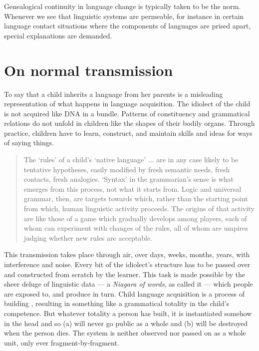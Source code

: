 Genealogical continuity in language change is typically taken to be the 
norm. Whenever we see that linguistic systems are permeable, for instance in certain language contact situations where the 
components of languages are prised apart, special explanations are 
demanded. 

\section{On normal transmission}

To say that a child inherits a language from her parents is a misleading representation of what happens in language acquisition. The idiolect of the child is not acquired like DNA in a bundle. Patterns of constituency and grammatical relations do not unfold in children like the shapes of their bodily organs. Through practice, children have to learn, construct, and maintain skills and ideas for ways of saying things. 

\begin{quotation}
The \textquoteleft rules' of a child's \textquoteleft native language' ... are in any case likely to be tentative hypotheses, easily modified by fresh semantic needs, fresh contacts, fresh analogies. \textquoteleft Syntax' in the grammarian's sense is what emerges from this process, not what it starts from. \citep[190]{le_page_acts_1985} Logic and universal grammar, then, are targets towards which, rather than the starting point from which, human linguistic activity proceeds. The origins of that activity are like those of a game which gradually develops among players, each of whom can experiment with changes of the rules, all of whom are umpires judging whether new rules are acceptable. \citep[197]{le_page_acts_1985} 
\end{quotation}

This transmission takes place through air, over days, weeks, months, years, with interference and noise. Every bit of the idiolect's structure has to be passed over and constructed from scratch by the learner. This task is made possible by the sheer deluge of linguistic data --- a \textit{Niagara of words}, as \citet[12]{hayakawa_language_1978} called it --- which people are exposed to, and produce in turn. Child language acquisition is a process of building \citep{tomasello_constructing_2003}, resulting in something like a grammatical totality in the child's competence. But whatever totality a person has built, it is instantiated somehow in the head and so (a) will never go public as a whole and (b) will be destroyed when the person dies. The system is neither observed nor passed on as a whole unit, only ever fragment-by-fragment.

